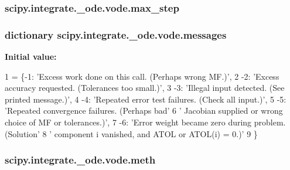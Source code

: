 \subsubsection[{max\+\_\+step}]{\setlength{\rightskip}{0pt plus 5cm}scipy.\+integrate.\+\_\+ode.\+vode.\+max\+\_\+step}\label{classscipy_1_1integrate_1_1__ode_1_1vode_aca0347be686fd68b9a7bb2259b52755b}
\hypertarget{classscipy_1_1integrate_1_1__ode_1_1vode_a84cb7d512725f0b7d9931733992829e8}{}
\subsubsection[{messages}]{\setlength{\rightskip}{0pt plus 5cm}dictionary scipy.\+integrate.\+\_\+ode.\+vode.\+messages\hspace{0.3cm}{\ttfamily [static]}}\label{classscipy_1_1integrate_1_1__ode_1_1vode_a84cb7d512725f0b7d9931733992829e8}
{\bfseries Initial value\+:}
\begin{DoxyCode}
1 = \{-1: \textcolor{stringliteral}{'Excess work done on this call. (Perhaps wrong MF.)'},
2                 -2: \textcolor{stringliteral}{'Excess accuracy requested. (Tolerances too small.)'},
3                 -3: \textcolor{stringliteral}{'Illegal input detected. (See printed message.)'},
4                 -4: \textcolor{stringliteral}{'Repeated error test failures. (Check all input.)'},
5                 -5: \textcolor{stringliteral}{'Repeated convergence failures. (Perhaps bad'}
6                 \textcolor{stringliteral}{' Jacobian supplied or wrong choice of MF or tolerances.)'},
7                 -6: \textcolor{stringliteral}{'Error weight became zero during problem. (Solution'}
8                 \textcolor{stringliteral}{' component i vanished, and ATOL or ATOL(i) = 0.)'}
9                 \}
\end{DoxyCode}
\hypertarget{classscipy_1_1integrate_1_1__ode_1_1vode_ace0d650b468a54b053826cef79f501e3}{}
\subsubsection[{meth}]{\setlength{\rightskip}{0pt plus 5cm}scipy.\+integrate.\+\_\+ode.\+vode.\+meth}\label{classscipy_1_1integrate_1_1__ode_1_1vode_ace0d650b468a54b053826cef79f501e3}
\hypertarget{classscipy_1_1integrate_1_1__ode_1_1vode_a54bebd0cd4c17ac2555de3662cfac052}{}
